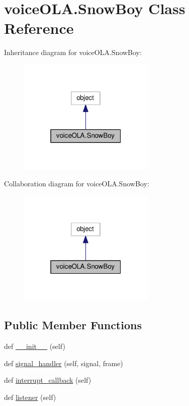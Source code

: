 \hypertarget{classvoiceOLA_1_1SnowBoy}{}\section{voice\+O\+L\+A.\+Snow\+Boy Class Reference}
\label{classvoiceOLA_1_1SnowBoy}


Inheritance diagram for voice\+O\+L\+A.\+Snow\+Boy\+:
\nopagebreak
\begin{figure}[H]
\begin{center}
\leavevmode
\includegraphics[width=184pt]{classvoiceOLA_1_1SnowBoy__inherit__graph}
\end{center}
\end{figure}


Collaboration diagram for voice\+O\+L\+A.\+Snow\+Boy\+:
\nopagebreak
\begin{figure}[H]
\begin{center}
\leavevmode
\includegraphics[width=184pt]{classvoiceOLA_1_1SnowBoy__coll__graph}
\end{center}
\end{figure}
\subsection*{Public Member Functions}
\begin{DoxyCompactItemize}
\item 
def \hyperlink{classvoiceOLA_1_1SnowBoy_a8e78736d7f6c4bf9bc79aa857c9e1f36}{\+\_\+\+\_\+init\+\_\+\+\_\+} (self)
\item 
def \hyperlink{classvoiceOLA_1_1SnowBoy_a2770703754e331b443acbcc3fe97a5ca}{signal\+\_\+handler} (self, signal, frame)
\item 
def \hyperlink{classvoiceOLA_1_1SnowBoy_a14734dcdb17fbfd5709d3abf47c77e0e}{interrupt\+\_\+callback} (self)
\item 
def \hyperlink{classvoiceOLA_1_1SnowBoy_a0b7f93d9599b0862b67f1ecb3dc56b6e}{listener} (self)
\end{DoxyCompactItemize}
